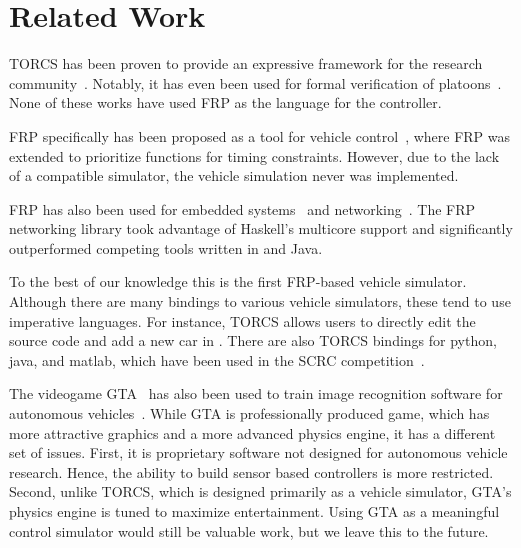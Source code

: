 \section{Related Work}

TORCS has been proven to provide an expressive framework for the research community~\cite{OnievaPAMP09,conf/cig/CardamoneLL09,conf/cig/MunozGS10}. 
Notably, it has even been used for formal verification of platoons~\cite{kamali2016formal,xu2016experimental}. 
None of these works have used FRP as the language for the controller.


FRP specifically has been proposed as a tool for vehicle control~\cite{kazemi2016,zou2016}, where FRP was extended to prioritize functions for timing constraints. However, due to the lack of a compatible simulator, the vehicle simulation never was implemented. 

FRP has also been used for embedded systems~\cite{helbling2016juniper} and networking~\cite{voellmy2012scalable}.
The FRP networking library took advantage of Haskell's multicore support and significantly outperformed competing tools written in \CC and Java.


To the best of our knowledge this is the first FRP-based vehicle simulator.
Although there are many bindings to various vehicle simulators, these tend to use imperative languages.
For instance, TORCS allows users to directly edit the source code and add a new car 
in \CC.
There are also TORCS bindings for python, java, and matlab, which have been used in the SCRC competition~\cite{SCRC}.

The videogame GTA~\cite{gtaV} has also been used to train image recognition software for autonomous vehicles~\cite{gtaPrinceton}.
While GTA is professionally produced game, which has more attractive graphics and a more advanced physics engine, it has a different set of issues.
First, it is proprietary software not designed for autonomous vehicle research. 
Hence, the ability to build sensor based controllers is more restricted. 
Second, unlike TORCS, which is designed primarily as a vehicle simulator, GTA's physics engine is tuned to maximize entertainment.
Using GTA as a meaningful control simulator would still be valuable work, but we leave this to the future.
